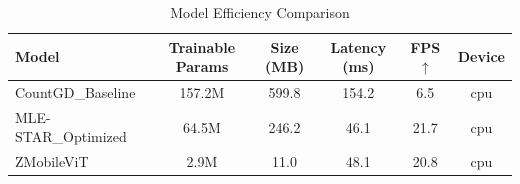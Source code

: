 \begin{table}[htbp]
\centering
\caption{Model Efficiency Comparison}
\label{tab:efficiency_results}
\begin{tabular}{lccccc}
\toprule
Model & Trainable Params & Size (MB) & Latency (ms) & FPS $\uparrow$ & Device \\
\midrule
CountGD_Baseline & 157.2M & 599.8 & 154.2 & 6.5 & cpu \\
MLE-STAR_Optimized & 64.5M & 246.2 & 46.1 & 21.7 & cpu \\
ZMobileViT & 2.9M & 11.0 & 48.1 & 20.8 & cpu \\
\bottomrule
\end{tabular}
\end{table}
